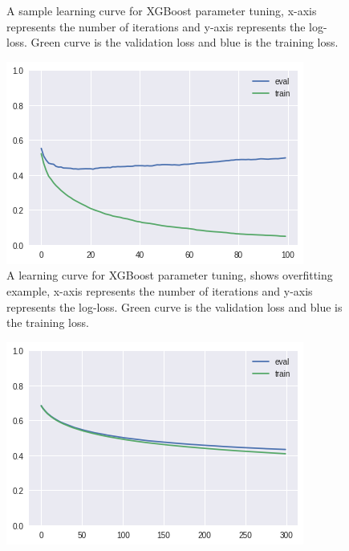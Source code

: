 \begin{itemize}
\begin{itemize}
\begin{figure}[H]
    \caption{A sample learning curve for XGBoost parameter tuning, x-axis represents the number of iterations and y-axis represents the log-loss. Green curve is the validation loss and blue is the training loss.}
    \label{xg}
    \end{figure}
    \begin{minipage}{0.43\textwidth}
    \begin{figure}[H]
    \centering
    \includegraphics[width=\textwidth]{xg_over}
    \caption{A learning curve for XGBoost parameter tuning, shows overfitting example, x-axis represents the number of iterations and y-axis represents the log-loss. Green curve is the validation loss and blue is the training loss.}
    \label{xgover}
    \end{figure}
    \end{minipage}\hfill
    \begin{minipage}{0.43\textwidth}
    \begin{figure}[H]
    \centering
    \includegraphics[width=\textwidth]{xg_under}

\end{figure}
\end{minipage}
\end{itemize}
\end{itemize}
